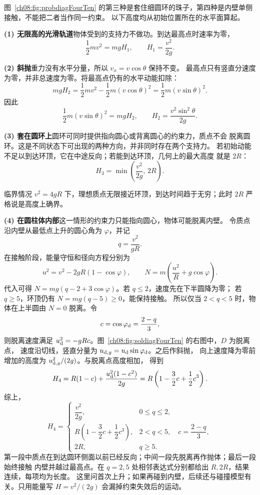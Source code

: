 \begin{xesolution}
图~\ref{ch08:fig:probdiagFourTen} 的第三种是套住细圆环的珠子，第四种是内壁单侧接触，不能把二者当作同一约束。
以下高度均从初始位置所在的水平面算起。

\textbf{(1) 无限高的光滑轨道}\quad 物体受到的支持力不做功。到达最高点时速率为零，
\[
 \frac12mv^2=mgH_1,
 \qquad
 \boxed{H_1=\frac{v^2}{2g}}.
\]

\textbf{(2) 斜抛}\quad 重力没有水平分量，所以 $v_x=v\cos\theta$ 保持不变。
最高点只有竖直分速度为零，并非总速度为零。将最高点仍有的水平动能扣除：
\[
 mgH_2=\frac12mv^2-\frac12m(v\cos\theta)^2=\frac12m(v\sin\theta)^2.
\]
因此
\[
 \frac12m(v\sin\theta)^2=mgH_2,
 \qquad
 \boxed{H_2=\frac{v^2\sin^2\theta}{2g}}.
\]

\textbf{(3) 套在圆环上}\quad 圆环可同时提供指向圆心或背离圆心的约束力，质点不会
脱离圆环。这是不同状态下可出现的两种方向，并非同时存在两个支持力。
若初始动能不足以到达环顶，它在中途反向；若能到达环顶，几何上的最大高度
就是 $2R$：
\[
 \boxed{H_3=\min\left(\frac{v^2}{2g},\,2R\right)}.
\]

临界情况 $v^2=4gR$ 下，理想质点无限接近环顶，到达时间趋于无穷；此时 $2R$ 严格说是高度上确界。

\textbf{(4) 在圆柱体内部}\quad 这一情形的约束力只能指向圆心，物体可能脱离内壁。
令质点沿内壁从最低点上升的圆心角为 $\varphi$，并记
\[
 q=\frac{v^2}{gR}.
\]
在接触阶段，能量守恒和径向方程分别为
\[
 u^2=v^2-2gR(1-\cos\varphi),
 \qquad
 N=m\left(\frac{u^2}{R}+g\cos\varphi\right).
\]
代入可得 $N=mg(q-2+3\cos\varphi)$。若 $q\le2$，速度先在下半圆降为零；
若 $q\ge5$，环顶仍有 $N=mg(q-5)\ge0$，能保持接触。
所以仅当 $2<q<5$ 时，物体在上半圆由 $N=0$ 脱离。令
\[
 c=\cos\varphi_{\rm d}=\frac{2-q}{3},
\]
则脱离速度满足 $u_{\rm d}^2=-gRc$。图~\ref{ch08:fig:soldiagFourTen} 的右图中，$D$ 为脱离点，
速度沿切线，竖直分量为 $u_{{\rm d},y}=u_{\rm d}\sin\varphi_{\rm d}$。之后作斜抛，
向上速度降为零前增加的高度为 $u_{{\rm d},y}^2/(2g)$。与脱离点高度相加，
得到
\[
 H_4
 =R(1-c)+\frac{u_{\rm d}^2(1-c^2)}{2g}
 =R\left(1-\frac32c+\frac12c^3\right).
\]
\soldiagFourTen
综上，
\[
 \boxed{
 H_4=
 \begin{cases}
 \dfrac{v^2}{2g},&0\le q\le2,\\[6pt]
 R\left(1-\dfrac32c+\dfrac12c^3\right),
   &2<q<5,\quad c=\dfrac{2-q}{3},\\[6pt]
 2R,&q\ge5.
 \end{cases}}
\]
第一段中质点在到达圆环侧面以前已经反向；中间一段先脱离再作抛体；最后一段始终接触
内壁并越过最高点。在 $q=2,5$ 处相邻表达式分别都给出 $R,2R$，结果连续，每项均为长度。
这里问首次上升；如果再碰到内壁，后续还与碰撞模型有关。只用能量写 $H=v^2/(2g)$ 会漏掉约束失效后的运动。
\end{xesolution}

